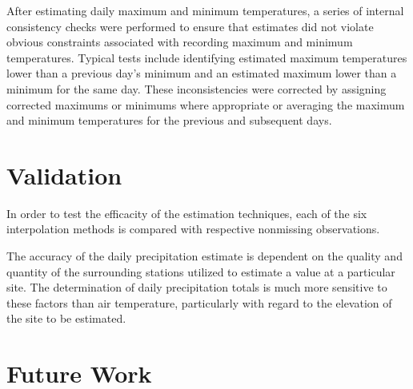 \documentclass[WHATMANUAL.tex]{subfiles}
\begin{document}
After estimating daily maximum and minimum temperatures, a series of internal consistency checks were
performed to ensure that estimates did not violate obvious constraints associated with recording maximum
and minimum temperatures. Typical tests include identifying estimated maximum temperatures lower than a
previous day’s minimum and an estimated maximum lower than a minimum for the same day. These inconsistencies were corrected by assigning corrected maximums or minimums where appropriate
or averaging the maximum and minimum temperatures for the previous and subsequent days.

\section{Validation}

In order to test the efficacity of the estimation techniques, each of the six interpolation methods is compared with respective nonmissing observations.

The accuracy of the daily precipitation estimate is dependent on the quality and quantity of the surrounding stations utilized to estimate a value at a particular site. The determination of daily precipitation totals is much more sensitive to these factors than air temperature, particularly with regard to the elevation of the site to be estimated.

\section{Future Work}
\end{document}
